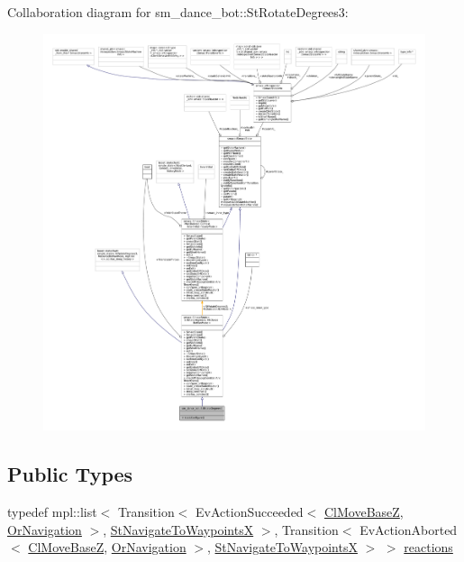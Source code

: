 Collaboration diagram for sm\+\_\+dance\+\_\+bot\+:\+:St\+Rotate\+Degrees3\+:
\nopagebreak
\begin{figure}[H]
\begin{center}
\leavevmode
\includegraphics[width=350pt]{structsm__dance__bot_1_1StRotateDegrees3__coll__graph}
\end{center}
\end{figure}
\subsection*{Public Types}
\begin{DoxyCompactItemize}
\item 
typedef mpl\+::list$<$ Transition$<$ Ev\+Action\+Succeeded$<$ \hyperlink{classmove__base__z__client_1_1ClMoveBaseZ}{Cl\+Move\+BaseZ}, \hyperlink{classsm__dance__bot_1_1OrNavigation}{Or\+Navigation} $>$, \hyperlink{structsm__dance__bot_1_1StNavigateToWaypointsX}{St\+Navigate\+To\+WaypointsX} $>$, Transition$<$ Ev\+Action\+Aborted$<$ \hyperlink{classmove__base__z__client_1_1ClMoveBaseZ}{Cl\+Move\+BaseZ}, \hyperlink{classsm__dance__bot_1_1OrNavigation}{Or\+Navigation} $>$, \hyperlink{structsm__dance__bot_1_1StNavigateToWaypointsX}{St\+Navigate\+To\+WaypointsX} $>$ $>$ \hyperlink{structsm__dance__bot_1_1StRotateDegrees3_afbfb018473d5a16b0b111b3b626aca6b}{reactions}
\end{DoxyCompactItemize}
